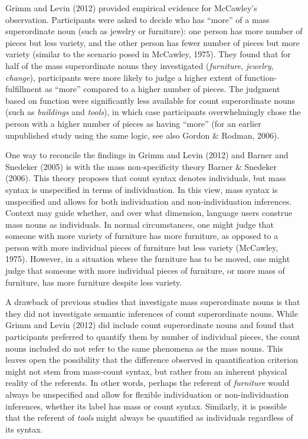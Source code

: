 \documentclass[
  man,floatsintext]{apa6}
\begin{document}
Grimm and Levin (2012) provided empirical evidence for McCawley's observation. Participants were asked to decide who has ``more'' of a mass superordinate noun (such as jewelry or furniture): one person has more number of pieces but less variety, and the other person has fewer number of pieces but more variety (similar to the scenario posed in McCawley, 1975). They found that for half of the mass superordinate nouns they investigated (\emph{furniture}, \emph{jewelry}, \emph{change}), participants were more likely to judge a higher extent of function-fulfillment as ``more'' compared to a higher number of pieces. The judgment based on function were significantly less available for count superordinate nouns (such as \emph{buildings} and \emph{tools}), in which case participants overwhelmingly chose the person with a higher number of pieces as having ``more'' (for an earlier unpublished study using the same logic, see also Gordon \& Rodman, 2006).

One way to reconcile the findings in Grimm and Levin (2012) and Barner and Snedeker (2005) is with the mass non-specificity theory Barner \& Snedeker (2006). This theory proposes that count syntax denotes individuals, but mass syntax is unspecified in terms of individuation. In this view, mass syntax is unspecified and allows for both individuation and non-individuation inferences. Context may guide whether, and over what dimension, language users construe mass nouns as individuals. In normal circumstances, one might judge that someone with more variety of furniture has more furniture, as opposed to a person with more individual pieces of furniture but less variety (McCawley, 1975). However, in a situation where the furniture has to be moved, one might judge that someone with more individual pieces of furniture, or more mass of furniture, has more furniture despite less variety.

A drawback of previous studies that investigate mass superordinate nouns is that they did not investigate semantic inferences of count superordinate nouns. While Grimm and Levin (2012) did include count superordinate nouns and found that participants preferred to quantify them by number of individual pieces, the count nouns included do not refer to the same phenomena as the mass nouns. This leaves open the possibility that the difference observed in quantification criterion might not stem from mass-count syntax, but rather from an inherent physical reality of the referents. In other words, perhaps the referent of \emph{furniture} would always be unspecified and allow for flexible individuation or non-individuation inferences, whether its label has mass or count syntax. Similarly, it is possible that the referent of \emph{tools} might always be quantified as individuals regardless of its syntax.
\end{document}
